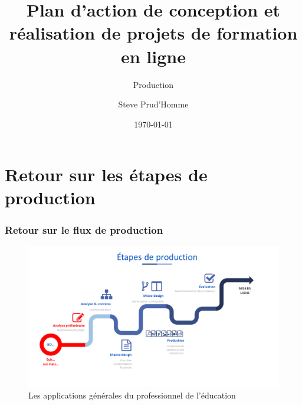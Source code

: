 \title{Plan d’action de conception et réalisation de projets de formation en ligne} 
\subtitle{Production}
\author{Steve Prud'Homme} 
\date{\today} 

\begin{frame}

\end{frame}
\frame{\titlepage} 
\pagebreak
\usebackgroundtemplate{ } 


\section{Retour sur les étapes de production} 
\begin{frame}
\frametitle{Retour sur le flux de production}
\begin{figure}
\includegraphics[scale=0.20]{flux.png}
\caption{Les applications générales du professionnel de l'éducation}
\end{figure}
\end{frame}


